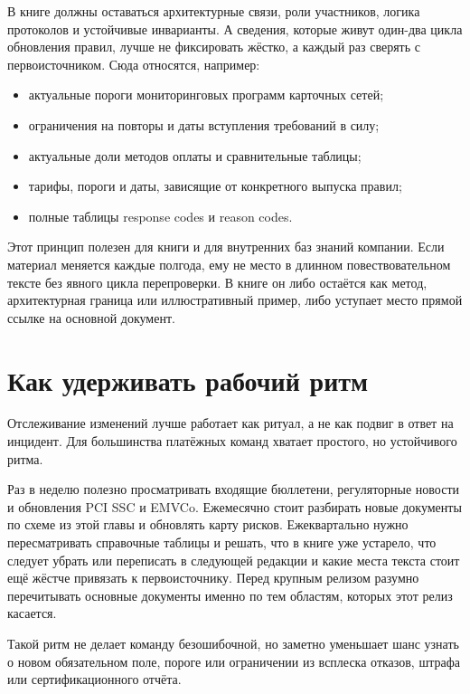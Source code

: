 В книге должны оставаться архитектурные связи, роли участников,
логика протоколов и устойчивые инварианты. А сведения, которые
живут один-два цикла обновления правил, лучше не фиксировать
жёстко, а каждый раз сверять с первоисточником. Сюда относятся,
например:
\begin{itemize}
  \item актуальные пороги мониторинговых программ карточных сетей;
  \item ограничения на повторы и даты вступления требований в силу;
  \item актуальные доли методов оплаты и сравнительные таблицы;
  \item тарифы, пороги и даты, зависящие от конкретного выпуска правил;
  \item полные таблицы response codes и reason codes.
\end{itemize}
Этот принцип полезен для книги и для внутренних баз знаний компании. Если материал меняется каждые полгода,
ему не место в длинном повествовательном тексте без явного цикла
перепроверки. В книге он либо остаётся как метод, архитектурная
граница или иллюстративный пример, либо уступает место прямой
ссылке на основной документ.

\section{Как удерживать рабочий ритм}
\label{sec:ps-tracking-rhythm}

Отслеживание изменений лучше работает как ритуал, а не как подвиг
в ответ на инцидент. Для большинства платёжных команд хватает
простого, но устойчивого ритма.

Раз в неделю полезно просматривать входящие бюллетени,
регуляторные новости и обновления PCI SSC и EMVCo. Ежемесячно
стоит разбирать новые документы по схеме из этой главы
и обновлять карту рисков. Ежеквартально нужно пересматривать
справочные таблицы и решать, что в книге уже устарело, что
следует убрать или переписать в следующей редакции и какие места
текста стоит ещё жёстче привязать к первоисточнику. Перед крупным
релизом разумно перечитывать основные документы именно
по тем областям, которых этот релиз касается.

Такой ритм не делает команду безошибочной, но заметно уменьшает
шанс узнать о новом обязательном поле, пороге или ограничении
из всплеска отказов, штрафа или сертификационного отчёта.

